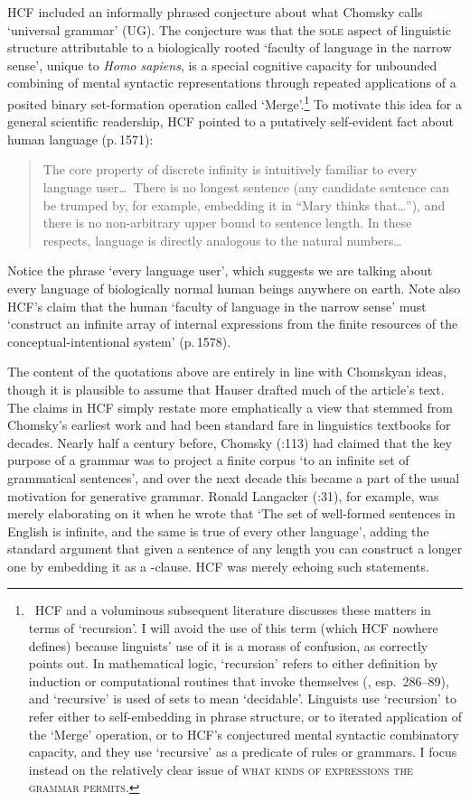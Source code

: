\documentclass[output=paper,colorlinks,citecolor=brown
]{langscibook}
\begin{document}
HCF included an informally phrased conjecture about what Chomsky calls
`universal grammar' (UG). The conjecture was that the \textsc{sole}
aspect of linguistic structure attributable to a biologically rooted
`faculty of language in the narrow sense', unique to \textit{Homo sapiens},
is a special cognitive capacity for unbounded combining of mental
syntactic representations through repeated applications of a posited
binary set-formation operation called `Merge'.\footnote{\,
   HCF and a voluminous subsequent literature discusses these matters
   in terms of `recursion'. I will avoid the use of this term (which
   HCF nowhere defines) because linguists' use of it is a morass of
   confusion, as \citet{Lobina14} correctly points out. In mathematical
   logic, `recursion' refers to either definition by induction or
   computational routines that invoke themselves (\citealt{Soare96},
   esp.\ 286--89), and `recursive' is used of sets to mean `decidable'.
   Linguists use `recursion' to refer either to self-embedding in
   phrase structure, or to iterated application of the `Merge'
   operation, or to HCF's conjectured mental syntactic combinatory
   capacity, and they use `recursive' as a predicate of rules or
   grammars. I focus instead on the relatively clear issue of
   \textsc{what kinds of expressions the grammar permits}.}
To motivate this idea for a general scientific readership, HCF pointed
to a putatively self-evident fact about human language (p.\,1571):
\begin{quote}
The core property of discrete infinity is intuitively familiar to every
language user\ldots\ There is no longest sentence (any candidate sentence
can be trumped by, for example, embedding it in ``Mary thinks that\ldots''),
and there is no non-arbitrary upper bound to sentence length. In these
respects, language is directly analogous to the natural numbers\ldots
\end{quote}
Notice the phrase `every language user', which suggests we are talking
about every language of biologically normal human beings anywhere on
earth. Note also HCF's claim that the human `faculty of language in the
narrow sense' must `construct an infinite array of internal expressions
from the finite resources of the conceptual-intentional system' (p.\,1578).

The content of the quotations above are entirely in line with Chomskyan
ideas, though it is plausible to assume that Hauser drafted much of the
article's text. The claims in HCF simply restate more emphatically a
view that stemmed from Chomsky's earliest work and had been standard
fare in linguistics textbooks for decades. Nearly half a century before,
Chomsky (\citeyear{Chomsky56}:113) had claimed that the key purpose
of a grammar was to project a finite corpus `to an infinite set of
grammatical sentences', and over the next decade this became a part
of the usual motivation for generative grammar. Ronald Langacker
(\citeyear{Langacker68}:31), for example, was merely elaborating on
it when he wrote that `The set of well-formed sentences in English
is infinite, and the same is true of every other language', adding
the standard argument that given a sentence of any length you can
construct a longer one by embedding it as a -clause.
HCF was merely echoing such statements.
\end{document}
